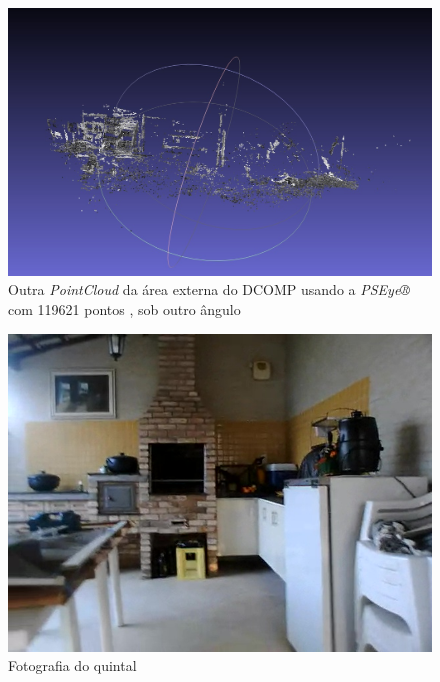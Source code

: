 \begin{figure}[H]
	\centering
		\includegraphics[width= \textwidth]{Imagens/figura4-8.jpg}
	\caption{Outra \textit{PointCloud} da área externa do DCOMP usando a \textit{PSEye®} com 119621 pontos , sob outro ângulo}
	\label{fig4:8}
\end{figure}

\begin{figure}[H]
	\centering
		\includegraphics[width= \textwidth]{Imagens/figura4-12.jpg}
	\caption{Fotografia do quintal}
	\label{fig4:12}
\end{figure}

